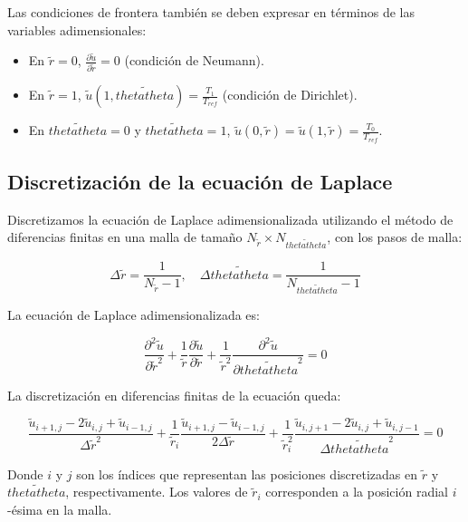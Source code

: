 Las condiciones de frontera también se deben expresar en términos de las variables adimensionales:

\begin{itemize}
    \item En \( \tilde{r} = 0 \), \( \frac{\partial \tilde{u}}{\partial \tilde{r}} = 0 \) (condición de Neumann).
    \item En \( \tilde{r} = 1 \), \( \tilde{u}(1, \tilde{thetatheta}) = \frac{T_1}{T_{ref}} \) (condición de Dirichlet).
    \item En \( \tilde{thetatheta} = 0 \) y \( \tilde{thetatheta} = 1 \), \( \tilde{u}(0, \tilde{r}) = \tilde{u}(1, \tilde{r}) = \frac{T_0}{T_{ref}} \).
\end{itemize}


\subsection{Discretización de la ecuación de Laplace}

Discretizamos la ecuación de Laplace adimensionalizada utilizando el método de diferencias finitas en una malla de tamaño \(N_{\tilde{r}} \times N_{\tilde{thetatheta}}\), con los pasos de malla:

\[
\Delta \tilde{r} = \frac{1}{N_{\tilde{r}} - 1}, \quad \Delta \tilde{thetatheta} = \frac{1}{N_{\tilde{thetatheta}} - 1}
\]

La ecuación de Laplace adimensionalizada es:

\begin{equation}
    \frac{\partial^2 \tilde{u}}{\partial \tilde{r}^2} + \frac{1}{\tilde{r}} \frac{\partial \tilde{u}}{\partial \tilde{r}} + \frac{1}{\tilde{r}^2} \frac{\partial^2 \tilde{u}}{\partial \tilde{thetatheta}^2} = 0
\end{equation}

La discretización en diferencias finitas de la ecuación queda:

\begin{equation}
    \frac{\tilde{u}_{i+1,j} - 2\tilde{u}_{i,j} + \tilde{u}_{i-1,j}}{\Delta \tilde{r}^2} + \frac{1}{\tilde{r}_i} \frac{\tilde{u}_{i+1,j} - \tilde{u}_{i-1,j}}{2 \Delta \tilde{r}} + \frac{1}{\tilde{r}_i^2} \frac{\tilde{u}_{i,j+1} - 2\tilde{u}_{i,j} + \tilde{u}_{i,j-1}}{\Delta \tilde{thetatheta}^2} = 0
\end{equation}

Donde \(i\) y \(j\) son los índices que representan las posiciones discretizadas en \(\tilde{r}\) y \(\tilde{thetatheta}\), respectivamente. Los valores de \(\tilde{r}_i\) corresponden a la posición radial \(i\)-ésima en la malla.


